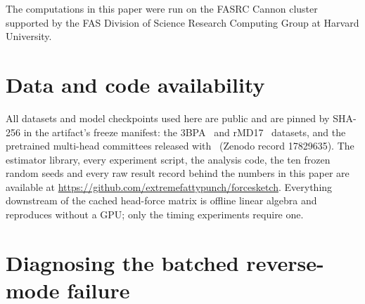 \documentclass{article}
\newcommand{\fsCodeUrl}{https://github.com/extremefattypunch/forcesketch}
\begin{document}
\begin{ack}
The computations in this paper were run on the FASRC Cannon cluster supported by
the FAS Division of Science Research Computing Group at Harvard University.
\end{ack}

\section*{Data and code availability}
All datasets and model checkpoints used here are public and are pinned by SHA-256 in the artifact's
freeze manifest: the 3BPA~\citep{botnet3bpa} and rMD17~\citep{rmd17} datasets, and the pretrained
multi-head committees released with~\citet{beck2025mhc} (Zenodo record 17829635). The estimator
library, every experiment script, the analysis code, the ten frozen random seeds and every raw
result record behind the numbers in this paper are available at
\url{\fsCodeUrl}. Everything downstream of the cached head-force matrix is offline linear algebra
and reproduces without a GPU; only the timing experiments require one.




\appendix

\section{Diagnosing the batched reverse-mode failure}
\label{app:tensorexpr}
\end{document}
